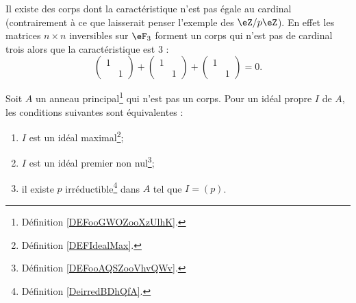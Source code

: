 \begin{example}
	Il existe des corps dont la caractéristique n'est pas égale au cardinal (contrairement à ce que laisserait penser l'exemple des \( \eZ/p\eZ\)). En effet les matrices \( n\times n\) inversibles sur \( \eF_{3}\) forment un corps qui n'est pas de cardinal trois alors que la caractéristique est \( 3\) :
	\begin{equation}
		\begin{pmatrix}
			1 &   \\
			  & 1
		\end{pmatrix}+\begin{pmatrix}
			1 &   \\
			  & 1
		\end{pmatrix}+\begin{pmatrix}
			1 &   \\
			  & 1
		\end{pmatrix}=0.
	\end{equation}
\end{example}



\begin{proposition} \label{PropomqcGe}
	Soit \( A\) un anneau principal\footnote{Définition \ref{DEFooGWOZooXzUlhK}.} qui n'est pas un corps. Pour un idéal propre \( I\) de \( A\), les conditions suivantes sont équivalentes :
	\begin{enumerate}
		\item       \label{ITEMooNOVFooEHtcwE}
		      \( I\) est un idéal maximal\footnote{Définition \ref{DEFIdealMax}.};
		\item       \label{ITEMooMQWVooNocVEU}
		      \( I\) est un idéal premier non nul\footnote{Définition \ref{DEFooAQSZooVhvQWv}.};
		\item       \label{ITEMooJBXGooEISNuW}
		      il existe \( p\) irréductible\footnote{Définition \ref{DeirredBDhQfA}.} dans \( A\) tel que \( I=(p)\).
	\end{enumerate}
\end{proposition}


